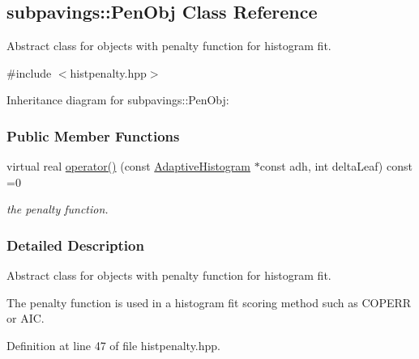 \hypertarget{classsubpavings_1_1PenObj}{\subsection{subpavings\-:\-:\-Pen\-Obj \-Class \-Reference}
\label{classsubpavings_1_1PenObj}
}


\-Abstract class for objects with penalty function for histogram fit.  




{\ttfamily \#include $<$histpenalty.\-hpp$>$}



\-Inheritance diagram for subpavings\-:\-:\-Pen\-Obj\-:
\subsubsection*{\-Public \-Member \-Functions}
\begin{DoxyCompactItemize}
\item 
virtual real \hyperlink{classsubpavings_1_1PenObj_a70c7efe90368cd85f0971ef548d678c1}{operator()} (const \hyperlink{classsubpavings_1_1AdaptiveHistogram}{\-Adaptive\-Histogram} $\ast$const adh, int delta\-Leaf) const =0
\begin{DoxyCompactList}\small\item\em the penalty function. \end{DoxyCompactList}\end{DoxyCompactItemize}


\subsubsection{\-Detailed \-Description}
\-Abstract class for objects with penalty function for histogram fit. 

\-The penalty function is used in a histogram fit scoring method such as \-C\-O\-P\-E\-R\-R or \-A\-I\-C. 

\-Definition at line 47 of file histpenalty.\-hpp.



